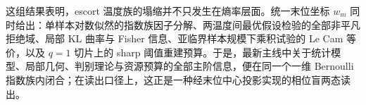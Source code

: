 \noindent 这组结果表明，escort 温度族的塌缩并不只发生在熵率层面。统一末位坐标 \(w_m\) 同时给出：单样本对数似然的指数族因子分解、两温度间最优假设检验的全部非平凡拒绝域、局部 KL 曲率与 Fisher 信息、亚临界样本规模下乘积试验的 Le Cam 等价，以及 \(q=1\) 切片上的 sharp 阈值重建预算。于是，最新主线中关于统计模型、局部几何、判别理论与资源预算的全部主阶信息，便在同一个一维 Bernoulli 指数族内闭合；在读出口径上，这正是一种经末位中心投影实现的相位盲两态读出。

\endinput
